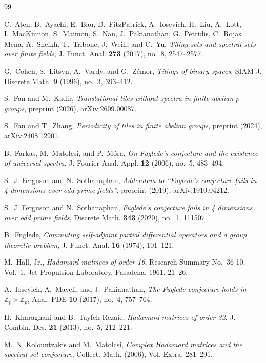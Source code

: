 \documentclass[11pt]{amsart}
\theoremstyle{definition}
\theoremstyle{remark}
\numberwithin{equation}{section}
\numberwithin{table}{section}
\newcommand{\Z}{\mathbb{Z}}
\begin{document}
\begin{thebibliography}{99}

C.~Aten, B.~Ayachi, E.~Bau, D.~FitzPatrick, A.~Iosevich, H.~Liu, A.~Lott, I.~MacKinnon, S.~Maimon, S.~Nan, J.~Pakianathan, G.~Petridis, C.~Rojas Mena, A.~Sheikh, T.~Tribone, J.~Weill, and C.~Yu, \emph{Tiling sets and spectral sets over finite fields}, J. Funct. Anal. \textbf{273} (2017), no.~8, 2547--2577.

G.~Cohen, S.~Litsyn, A.~Vardy, and G.~Z\'emor, \emph{Tilings of binary spaces}, SIAM J. Discrete Math. \textbf{9} (1996), no.~3, 393--412.

S.~Fan and M.~Kadir, \emph{Translational tiles without spectra in finite abelian $p$-groups}, preprint (2026), arXiv:2609.00087.

S.~Fan and T.~Zhang, \emph{Periodicity of tiles in finite abelian groups}, preprint (2024), arXiv:2408.12901.

B.~Farkas, M.~Matolcsi, and P.~M\'ora, \emph{On Fuglede's conjecture and the existence of universal spectra}, J. Fourier Anal. Appl. \textbf{12} (2006), no.~5, 483--494.

S.~J. Ferguson and N.~Sothanaphan, \emph{Addendum to ``Fuglede's conjecture fails in 4 dimensions over odd prime fields''}, preprint (2019), arXiv:1910.04212.

S.~J. Ferguson and N.~Sothanaphan, \emph{Fuglede's conjecture fails in 4 dimensions over odd prime fields}, Discrete Math. \textbf{343} (2020), no.~1, 111507.

B.~Fuglede, \emph{Commuting self-adjoint partial differential operators and a group theoretic problem}, J. Funct. Anal. \textbf{16} (1974), 101--121.

M.~Hall, Jr., \emph{Hadamard matrices of order 16}, Research Summary No.~36-10, Vol.~1, Jet Propulsion Laboratory, Pasadena, 1961, 21--26.

A.~Iosevich, A.~Mayeli, and J.~Pakianathan, \emph{The Fuglede conjecture holds in $\Z_p\times\Z_p$}, Anal. PDE \textbf{10} (2017), no.~4, 757--764.

H.~Kharaghani and B.~Tayfeh-Rezaie, \emph{Hadamard matrices of order 32}, J. Combin. Des. \textbf{21} (2013), no.~5, 212--221.

M.~N. Kolountzakis and M.~Matolcsi, \emph{Complex Hadamard matrices and the spectral set conjecture}, Collect. Math. (2006), Vol. Extra, 281--291.


\end{thebibliography}
\end{document}
